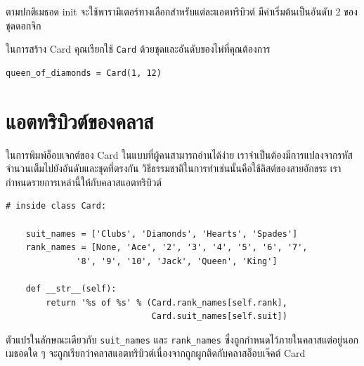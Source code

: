 ตามปกติเมธอด init จะใช้พารามิเตอร์ทางเลือกสำหรับแต่ละแอตทริบิวต์ มีค่าเริ่มต้นเป็นอันดับ 2 ของชุดดอกจิก



ในการสร้าง Card คุณเรียกใช้ {\tt Card} ด้วยชุดและอันดับของไพ่ที่คุณต้องการ

\begin{verbatim}
queen_of_diamonds = Card(1, 12)
\end{verbatim}
%


\section{แอตทริบิวต์ของคลาส} %
\label{class.attribute}


ในการพิมพ์อ็อบเจกต์ของ Card ในแบบที่ผู้คนสามารถอ่านได้ง่าย เราจำเป็นต้องมีการแปลงจากรหัสจำนวนเต็มไปยังอันดับและชุดที่ตรงกัน
วิธีธรรมชาติในการทำเช่นนั้นคือใช้ลิสต์ของสายอักขระ เรากำหนดรายการเหล่านี้ให้กับคลาสแอตทริบิวต์

\begin{verbatim}
# inside class Card:

    suit_names = ['Clubs', 'Diamonds', 'Hearts', 'Spades']
    rank_names = [None, 'Ace', '2', '3', '4', '5', '6', '7', 
              '8', '9', '10', 'Jack', 'Queen', 'King']

    def __str__(self):
        return '%s of %s' % (Card.rank_names[self.rank],
                             Card.suit_names[self.suit])
\end{verbatim}
%

ตัวแปรในลักษณะเดียวกับ \verb"suit_names" และ \verb"rank_names" ซึ่งถูกกำหนดไว้ภายในคลาสแต่อยู่นอกเมธอดใด ๆ  
จะถูกเรียกว่าคลาสแอตทริบิวต์เนื่องจากถูกผูกติดกับคลาสอ็อบเจ๊คต์ Card

